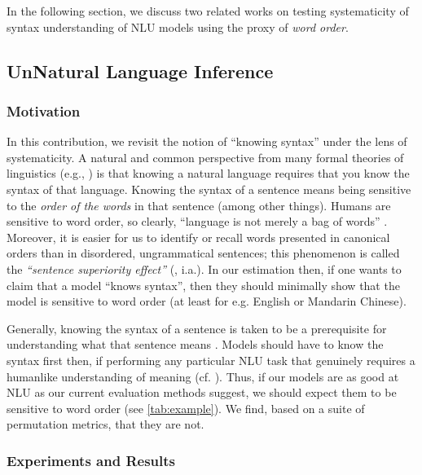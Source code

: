 \documentclass[12pt]{article}
\begin{document}
In the following section, we discuss two related works \cite{sinha2021,sinha2021a} on testing systematicity of syntax understanding of NLU models using the proxy of \textit{word order}.

\subsection{UnNatural Language Inference}

\subsubsection{Motivation}

In this contribution, \cite{sinha2021} we revisit the notion of ``knowing syntax'' under the lens of systematicity. A natural and common perspective from many formal theories of linguistics (e.g., \cite{chomsky-1995-minimalist}) is that knowing a natural language requires that you know the syntax of that language. Knowing the syntax of a sentence means being sensitive to the \textit{order of the words} in that sentence (among other things).  Humans are sensitive to word order, so clearly, ``language is not merely a bag of words'' \cite[p.156]{harris-1954-distributional}.
Moreover, it is easier for us to identify or recall words presented in canonical orders than in disordered, ungrammatical sentences; this phenomenon is called the \textit{``sentence superiority effect''} (\cite{cattell-1886-time, scheerer1981early, toyota-2001-changes, baddeley-etal-2009-working, snell-grainger-2017-sentence, snell2019word, wen-etal-2019-parallel}, i.a.).
In our estimation then, if one wants to claim that  a model ``knows syntax'', then they should minimally show that the model is sensitive to word order (at least for e.g. English or Mandarin Chinese).

Generally, knowing the syntax of a sentence is taken to be a prerequisite for understanding what that sentence means \cite{heim-kratzer-1998-semantics}.
Models should have to know the syntax first then, if performing any particular NLU task that genuinely requires a humanlike understanding of meaning (cf. \cite{bender-koller-2020-climbing}).
Thus, if our models are as good at NLU as our current evaluation methods suggest, we should expect them to be sensitive to word order (see \autoref{tab:example}).  We find, based on a suite of permutation metrics, that they are not.

\subsubsection{Experiments and Results}
\end{document}
